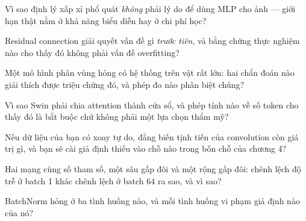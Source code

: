 \documentclass[../../deep_learning.tex]{subfiles}
\begin{document}
\begin{tukiem}
\item Vì sao định lý xấp xỉ phổ quát \emph{không} phải lý do để dùng MLP cho ảnh --- giới hạn thật nằm ở khả năng biểu diễn hay ở chi phí học?
\item Residual connection giải quyết vấn đề gì \emph{trước tiên}, và bằng chứng thực nghiệm nào cho thấy đó không phải vấn đề overfitting?
\item Một mô hình phân vùng hỏng có hệ thống trên vật rất lớn: hai chẩn đoán nào giải thích được triệu chứng đó, và phép đo nào phân biệt chúng?
\item Vì sao Swin phải chia attention thành cửa sổ, và phép tính nào về số token cho thấy đó là bắt buộc chứ không phải một lựa chọn thẩm mỹ?
\item Nếu dữ liệu của bạn có xoay tự do, đẳng biến tịnh tiến của convolution còn giá trị gì, và bạn sẽ cài giả định thiếu vào chỗ nào trong bốn chỗ của chương 4?
\item Hai mạng cùng số tham số, một sâu gấp đôi và một rộng gấp đôi: chênh lệch độ trễ ở batch 1 khác chênh lệch ở batch 64 ra sao, và vì sao?
\item BatchNorm hỏng ở ba tình huống nào, và mỗi tình huống vi phạm giả định nào của nó?
\end{tukiem}

\ifSubfilesClassLoaded{\printbibliography[title={Nguồn}]}{}
\end{document}
